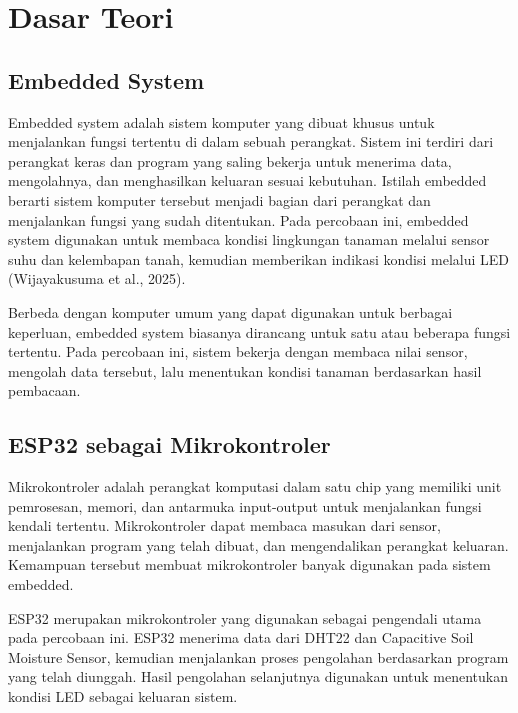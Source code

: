 \documentclass[12pt,a4paper]{article}
\begin{document}
\FloatBarrier

\section{Dasar Teori}

\subsection{Embedded System}

Embedded system adalah sistem komputer yang dibuat khusus untuk menjalankan fungsi tertentu di dalam sebuah perangkat. Sistem ini terdiri dari perangkat keras dan program yang saling bekerja untuk menerima data, mengolahnya, dan menghasilkan keluaran sesuai kebutuhan. Istilah embedded berarti sistem komputer tersebut menjadi bagian dari perangkat dan menjalankan fungsi yang sudah ditentukan. Pada percobaan ini, embedded system digunakan untuk membaca kondisi lingkungan tanaman melalui sensor suhu dan kelembapan tanah, kemudian memberikan indikasi kondisi melalui LED (Wijayakusuma et al., 2025).

Berbeda dengan komputer umum yang dapat digunakan untuk berbagai keperluan, embedded system biasanya dirancang untuk satu atau beberapa fungsi tertentu. Pada percobaan ini, sistem bekerja dengan membaca nilai sensor, mengolah data tersebut, lalu menentukan kondisi tanaman berdasarkan hasil pembacaan.

\subsection{ESP32 sebagai Mikrokontroler}

Mikrokontroler adalah perangkat komputasi dalam satu chip yang memiliki unit pemrosesan, memori, dan antarmuka input-output untuk menjalankan fungsi kendali tertentu. Mikrokontroler dapat membaca masukan dari sensor, menjalankan program yang telah dibuat, dan mengendalikan perangkat keluaran. Kemampuan tersebut membuat mikrokontroler banyak digunakan pada sistem embedded.

ESP32 merupakan mikrokontroler yang digunakan sebagai pengendali utama pada percobaan ini. ESP32 menerima data dari DHT22 dan Capacitive Soil Moisture Sensor, kemudian menjalankan proses pengolahan berdasarkan program yang telah diunggah. Hasil pengolahan selanjutnya digunakan untuk menentukan kondisi LED sebagai keluaran sistem.
\end{document}
